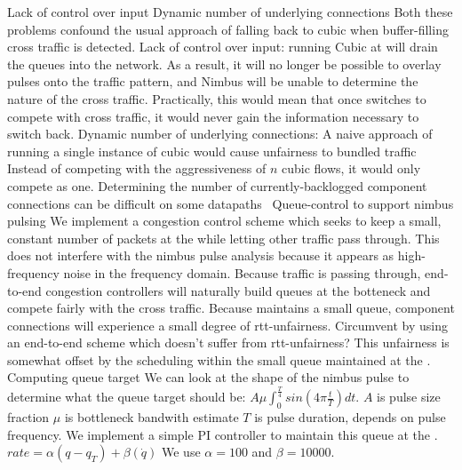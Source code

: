 \begin{outline}
        \3 Lack of control over input
        \3 Dynamic number of underlying connections 
    \2 Both these problems confound the usual approach of falling back to cubic when buffer-filling cross traffic is detected.
        \3 Lack of control over input: running Cubic at \inbox will drain the queues into the network. As a result, it will no longer be possible to overlay pulses onto the traffic pattern, and Nimbus will be unable to determine the nature of the cross traffic.
            \4 Practically, this would mean that once \inbox switches to compete with cross traffic, it would never gain the information necessary to switch back.
        \3 Dynamic number of underlying connections: A naive approach of running a single instance of cubic would cause unfairness to bundled traffic
            \4 Instead of competing with the aggressiveness of $n$ cubic flows, it would only compete as one.
            \4 Determining the number of currently-backlogged component connections can be difficult on some datapaths~\cite{heavy-hitters} 
\1 Queue-control to support nimbus pulsing
    \2 We implement a congestion control scheme which seeks to keep a small, constant number of packets at the \inbox while letting other traffic pass through.
        \3 This does not interfere with the nimbus pulse analysis because it appears as high-frequency noise in the frequency domain. 
        \3 Because traffic is passing through, end-to-end congestion controllers will naturally build queues at the botteneck and compete fairly with the cross traffic.
        \3 Because \inbox maintains a small queue, component connections will experience a small degree of rtt-unfairness.
            \4 Circumvent by using an end-to-end scheme which doesn't suffer from rtt-unfairness?
        \3 This unfairness is somewhat offset by the scheduling within the small queue maintained at the \inbox. 
\1 Computing \inbox queue target
    \2 We can look at the shape of the nimbus pulse to determine what the queue target should be: $A \mu \int_0^{\frac{T}{4}} sin(4 \pi \frac{t}{T}) dt$.
        \3 $A$ is pulse size fraction
        \3 $\mu$ is bottleneck bandwith estimate
        \3 $T$ is pulse duration, depends on pulse frequency.
\1 We implement a simple PI controller to maintain this queue at the \inbox.
    \2 $rate = \alpha (q - q_T) + \beta (\dot{q})$
        \3 We use $\alpha = 100$ and $\beta = 10000$.
    \2 
\end{outline}

